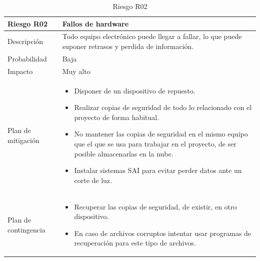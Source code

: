 \begin{table}[H]
	\centering
	\footnotesize
	\begin{tabularx}{\textwidth}{|l|X|}
		\hline
		\rowcolor[HTML]{C0C0C0} 
		\textbf{Riesgo R02}  & \textbf{Fallos de hardware} \\ \hline
		Descripción          & Todo equipo electrónico puede llegar a fallar, lo que puede suponer retrasos y perdida de información. \\ \hline
		Probabilidad         & Baja \\ \hline
		Impacto              & Muy alto \\ \hline
		Plan de mitigación   & \begin{minipage}[t]{\linewidth}
			\begin{itemize}[leftmargin=*, noitemsep]
				\item Disponer de un dispositivo de repuesto.
				\item Realizar copias de seguridad de todo lo relacionado con el proyecto de forma habitual.
				\item No mantener las copias de seguridad en el mismo equipo que el que se usa para trabajar en el proyecto, de ser posible almacenarlas en la nube.
				\item Instalar sistemas SAI para evitar perder datos ante un corte de luz.
			\end{itemize}
		\end{minipage} \\ \hline
		Plan de contingencia & \begin{minipage}[t]{\linewidth}
			\begin{itemize}[leftmargin=*, noitemsep]
				\item Recuperar las copias de seguridad, de existir, en otro dispositivo.
				\item En caso de archivos corruptos intentar usar programas de recuperación para este tipo de archivos.
			\end{itemize}
		\end{minipage} \\ \hline
	\end{tabularx}
	\caption{Riesgo R02}
	\label{tab:riesgo_2}
\end{table}

